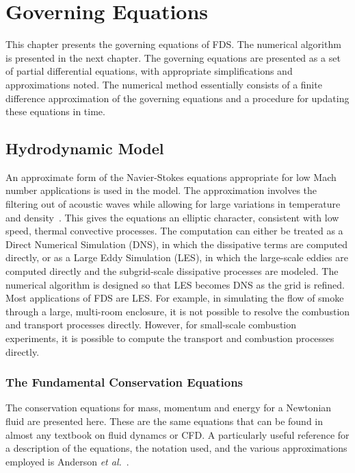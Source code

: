 \documentclass[11pt]{book}
\begin{document}
\chapter{Governing Equations}

\label{basisformodel}

This chapter presents the governing equations of FDS. The numerical algorithm is presented in the next chapter.
The governing equations are presented as a set of
partial differential equations, with appropriate simplifications and approximations
noted. The numerical method essentially consists of a finite difference approximation of the governing equations and a procedure for
updating these equations in time.

\section{Hydrodynamic Model}
\label{govequations}

An approximate form of the Navier-Stokes equations appropriate for
low Mach number applications is used in the model.
The approximation involves the filtering out of acoustic waves while
allowing for large variations in temperature and density~\cite{Rehm:1}.
This gives the equations an elliptic character, consistent with low speed,
thermal convective processes. The computation can either be treated as a
Direct Numerical Simulation (DNS), in which the dissipative terms are computed directly,
or as a Large Eddy Simulation (LES), in which the large-scale eddies are computed
directly and the subgrid-scale dissipative processes are modeled. The numerical algorithm is
designed so that LES becomes DNS as the grid is refined.
Most applications of FDS are LES. For example, in simulating the flow of smoke through a large, multi-room enclosure, it
is not possible to resolve the combustion and transport processes directly.
However, for small-scale combustion experiments,
it is possible to compute the transport and combustion processes directly.

\subsection{The Fundamental Conservation Equations}

\label{basicequations}

The conservation equations for mass, momentum and energy for a
Newtonian fluid are presented here. These are the same equations that can
be found in almost any textbook on fluid dynamcs or CFD. A particularly useful
reference for a description of the equations, the notation used,
and the various approximations employed is Anderson {\em et al.}~\cite{Anderson:1}.
\end{document}

